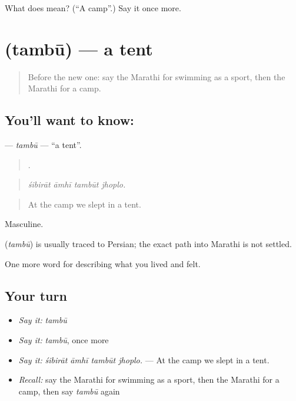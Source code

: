 \begin{tcolorbox}[breakable,colback=teal!4,colframe=teal!35!black,title={Before you move on}]
What does  mean? (\textquotedblleft{}A camp\textquotedblright{}.) Say it once more.
\end{tcolorbox}
\section[\texorpdfstring{\mr{तंबू} (tambū)}{तंबू (tambū)}]{ (tambū) — a tent}

\label{lesson:MR-C534-tambu}



\begin{quote}
Before the new one: say the Marathi for swimming as a sport, then the Marathi for a camp.
\end{quote}

\subsection*{You'll want to know: }
\textbf{} — \emph{tambū} — \textquotedblleft{}a tent\textquotedblright{}.

\begin{quote}
   .
\end{quote}

\begin{quote}
\emph{śibirāt āmhī tambūt jhoplo.}
\end{quote}

\begin{quote}
At the camp we slept in a tent.
\end{quote}

Masculine.

\begin{cousinweb}
\textbf{} (\emph{tambū}) is usually traced to Persian; the exact path into Marathi is not settled.
\end{cousinweb}

\begin{grammarlens}[title={What you've built}]
One more word for describing what you lived and felt.
\end{grammarlens}

\subsection*{Your turn}
\begin{itemize}
\raggedright
  \item \emph{Say it:} \emph{tambū}
  \item \emph{Say it:} \emph{tambū}, once more
  \item \emph{Say it:} \emph{śibirāt āmhī tambūt jhoplo.} — At the camp we slept in a tent.
  \item \emph{Recall:} say the Marathi for swimming as a sport, then the Marathi for a camp, then say \emph{tambū} again
\end{itemize}

